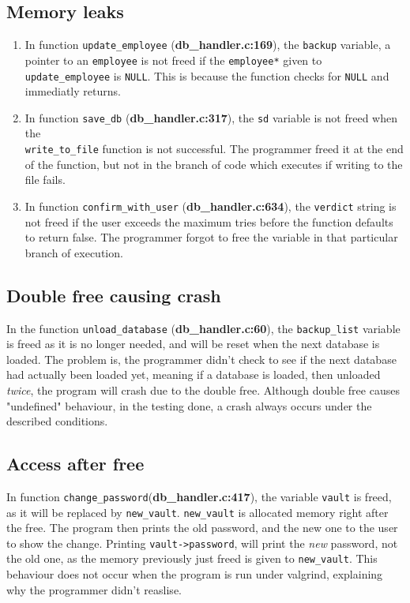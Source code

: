 \documentclass[]{article}
\begin{document}
\vspace*{0.8cm}
\subsection*{Memory leaks}
\begin{enumerate}
	\item In function \texttt{update\_employee} (\textbf{db\_handler.c:169}), the \texttt{backup} variable, a pointer to an \texttt{employee} is not freed if the \texttt{employee*} given to \texttt{update\_employee} is \texttt{NULL}. This is because the function checks for \texttt{NULL} and immediatly returns.
	\item In function \texttt{save\_db} (\textbf{db\_handler.c:317}), the \texttt{sd} variable is not freed when the\\\texttt{write\_to\_file} function is not successful. The programmer freed it at the end of the function, but not in the branch of code which executes if writing to the file fails.
	\item In function \texttt{confirm\_with\_user} (\textbf{db\_handler.c:634}), the \texttt{verdict} string is not freed if the user exceeds the maximum tries before the function defaults to return false. The programmer forgot to free the variable in that particular branch of execution.
\end{enumerate}

\subsection*{Double free causing crash}
In the function \texttt{unload\_database} (\textbf{db\_handler.c:60}), the \texttt{backup\_list} variable is freed as it is no longer needed, and will be reset when the next database is loaded. The problem is, the programmer didn't check to see if the next database had actually been loaded yet, meaning if a database is loaded, then unloaded \textit{twice}, the program will crash due to the double free. Although  double free causes "undefined" behaviour, in the testing done, a crash always occurs under the described conditions.

\subsection*{Access after free}
In function \texttt{change\_password}(\textbf{db\_handler.c:417}), the variable \texttt{vault} is freed, as it will be replaced by \texttt{new\_vault}. \texttt{new\_vault} is allocated memory right after the free. The program then prints the old password, and the new one to the user to show the change. Printing \texttt{vault->password}, will print the \textit{new} password, not the old one, as the memory previously just freed is given to \texttt{new\_vault}. This behaviour does not occur when the program is run under valgrind, explaining why the programmer didn't reaslise.
\end{document}
